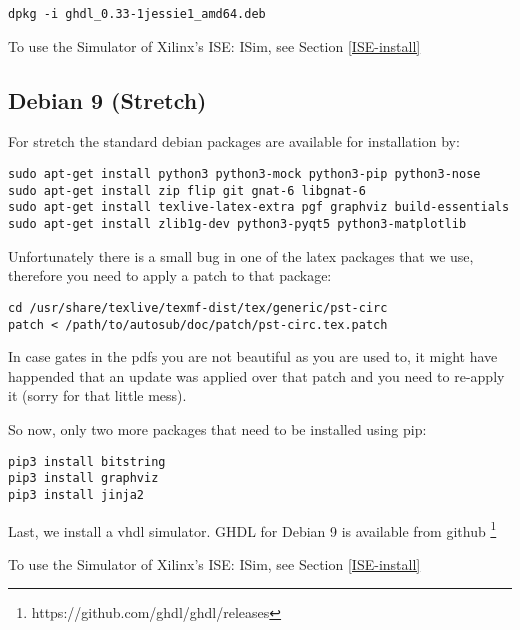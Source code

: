 \begin{verbatim}
dpkg -i ghdl_0.33-1jessie1_amd64.deb
\end{verbatim}

To use the Simulator of Xilinx's ISE: ISim, see Section \ref{ISE-install}


\subsection{Debian 9 (Stretch)}

For stretch the standard debian packages are available for installation by:

\begin{verbatim}
sudo apt-get install python3 python3-mock python3-pip python3-nose
sudo apt-get install zip flip git gnat-6 libgnat-6
sudo apt-get install texlive-latex-extra pgf graphviz build-essentials
sudo apt-get install zlib1g-dev python3-pyqt5 python3-matplotlib
\end{verbatim}

Unfortunately there is a small bug in one of the latex packages that we use,
therefore you need to apply a patch to that package:

\begin{verbatim}
cd /usr/share/texlive/texmf-dist/tex/generic/pst-circ
patch < /path/to/autosub/doc/patch/pst-circ.tex.patch
\end{verbatim}

In case gates in the pdfs you are not beautiful as you are used to, it might have
happended that an update was applied over that patch and you need to re-apply it (sorry for that little mess).

So now, only two more packages that need to be installed using pip:

\begin{verbatim}
pip3 install bitstring
pip3 install graphviz
pip3 install jinja2
\end{verbatim}

Last, we install a vhdl simulator. GHDL for Debian 9 is available from github \footnote{https://github.com/ghdl/ghdl/releases}

To use the Simulator of Xilinx's ISE: ISim, see Section \ref{ISE-install}

